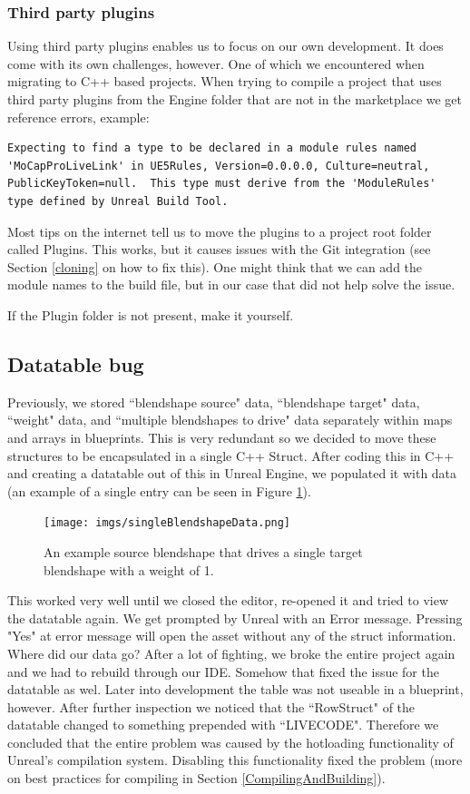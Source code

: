 \documentclass{uva-inf-article}
\begin{document}
\subsubsection{Third party plugins}
Using third party plugins enables us to focus on our own development. It does come with its own challenges, however. One of which we encountered when migrating to C++ based projects. When trying to compile a project that uses third party plugins from the Engine folder that are not in the marketplace we get reference errors, example:
\begin{lstlisting}
Expecting to find a type to be declared in a module rules named 'MoCapProLiveLink' in UE5Rules, Version=0.0.0.0, Culture=neutral, PublicKeyToken=null.  This type must derive from the 'ModuleRules' type defined by Unreal Build Tool.
\end{lstlisting}
Most tips on the internet tell us to move the plugins to a project root folder called Plugins. This works, but it causes issues with the Git integration (see Section \ref{cloning} on how to fix this). One might think that we can add the module names to the build file, but in our case that did not help solve the issue.

If the Plugin folder is not present, make it yourself.

\subsection{Datatable bug}\label{datatableBug}
Previously, we stored ``blendshape source" data, ``blendshape target" data, ``weight" data, and ``multiple blendshapes to drive" data separately within maps and arrays in blueprints. This is very redundant so we decided to move these structures to be encapsulated in a single C++ Struct. After coding this in C++ and creating a datatable out of this in Unreal Engine, we populated it with data (an example of a single entry can be seen in Figure \ref{fig:blendshapeStructExample}).

\begin{figure}[hbt!]
    \centering
    \texttt{[image: imgs/singleBlendshapeData.png]}
    \caption{An example source blendshape that drives a single target blendshape with a weight of 1.}
    \label{fig:blendshapeStructExample}
\end{figure}

This worked very well until we closed the editor, re-opened it and tried to view the datatable again. We get prompted by Unreal with an Error message. Pressing "Yes" at error message will open the asset without any of the struct information. Where did our data go? After a lot of fighting, we broke the entire project again and we had to rebuild through our IDE. Somehow that fixed the issue for the datatable as wel. Later into development the table was not useable in a blueprint, however. After further inspection we noticed that the ``RowStruct" of the datatable changed to something prepended with ``LIVECODE". Therefore we concluded that the entire problem was caused by the hotloading functionality of Unreal's compilation system. Disabling this functionality fixed the problem (more on best practices for compiling in Section \ref{CompilingAndBuilding}).
\end{document}
